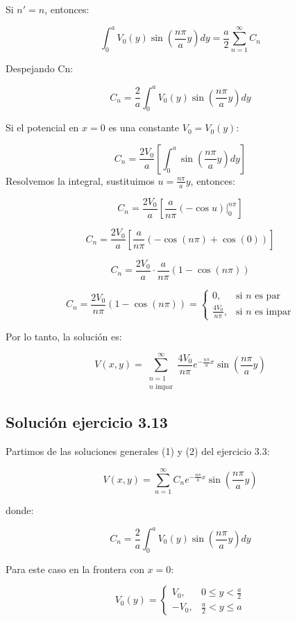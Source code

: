 \documentclass[12pt]{article}
\begin{document}
Si \( n' = n \), entonces:

\[
\int_0^a V_0(y) \sin\left( \frac{n \pi}{a} y \right) dy = \frac{a}{2} \sum_{n=1}^{\infty} C_n
\]

Despejando Cn:

\[
\boxed{C_n = \frac{2}{a} \int_0^a V_0(y) \sin\left( \frac{n \pi}{a} y \right) dy} \tag{2}
\]

Si el potencial en \( x = 0 \) es una constante \( V_0 = V_0(y) \):

\[
C_n = \frac{2V_0}{a} \left[ \int_0^a \sin\left( \frac{n\pi}{a} y \right) dy \right]
\]
Resolvemos la integral, sustituimos \( u = \frac{n\pi}{a}y \), entonces:

\[
C_n = \frac{2V_0}{a} \left[ \frac{a}{n\pi} (-\cos u) \Big|_0^{n\pi} \right]
\]

\[
C_n = \frac{2V_0}{a} \left[ \frac{a}{n\pi} \left( -\cos(n\pi) + \cos(0) \right) \right]
\]

\[
C_n = \frac{2V_0}{a} \cdot \frac{a}{n\pi} \left( 1 - \cos(n\pi) \right)
\]

\[
C_n = \frac{2V_0}{n\pi} (1 - \cos(n\pi)) =
\begin{cases}
0, & \text{si } n \text{ es par} \\
\frac{4V_0}{n\pi}, & \text{si } n \text{ es impar}
\end{cases}
\]

Por lo tanto, la solución es:

\[
\boxed{V(x,y) = \sum_{\substack{n=1 \\ n \text{ impar}}}^{\infty} \frac{4V_0}{n\pi} e^{-\frac{n\pi}{a}x} \sin\left( \frac{n\pi}{a} y \right)} \tag{3}
\]

\vspace{0.7cm}

\subsection*{Solución ejercicio 3.13}

Partimos de las soluciones generales (1) y (2) del ejercicio 3.3:

\[
V(x,y) = \sum_{n=1}^{\infty} C_n e^{-\frac{n\pi}{a}x} \sin\left( \frac{n\pi}{a} y \right)
\]

donde:

\[
C_n = \frac{2}{a} \int_0^a V_0(y) \sin\left( \frac{n\pi}{a} y \right) dy
\]

Para este caso en la frontera con \( x = 0 \):

\[
V_0(y) =
\begin{cases}
V_0,  & 0 \leq y < \frac{a}{2} \\
-V_0, & \frac{a}{2} < y \leq a
\end{cases}
\]
\end{document}
